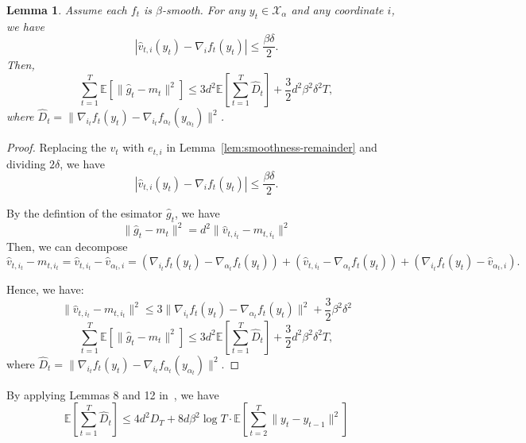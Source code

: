 \documentclass[journal,onecolumn]{IEEEtran}
\newcommand{\cX}{\mathcal{X}}
\theoremstyle{plain}
\newtheorem{lemma}[theorem]{Lemma}
\theoremstyle{definition}
\theoremstyle{remark}
\begin{document}
{\begin{lemma}
    Assume each $f_t$ is $\beta$-smooth. For any $y_t\in\cX_{\alpha}$ and any coordinate $i$, we have
    \begin{equation*}
        |\widehat{v}_{t,i}(y_t)-\nabla_i f_t(y_t)|\leq \frac{\beta\delta}{2}.
    \end{equation*}
    Then, 
    \begin{equation*}
        \sum_{t=1}^T \mathbb{E}\left[\|\widehat{g}_t-m_t\|^2\right]\leq 3d^2\mathbb{E}\left[\sum_{t=1}^T\widehat{D}_t\right]+\frac{3}{2}d^2\beta^2\delta^2T,
    \end{equation*}
    where $\widehat{D}_t=\|\nabla_{i_t} f_t(y_t)-\nabla_{i_t}f_{\alpha_t}(y_{\alpha_t})\|^2$.
\end{lemma}
\begin{proof}
    Replacing the $v_t$ with $e_{t,i}$ in Lemma~\ref{lem:smoothness-remainder} and dividing $2\delta$, we have
    \begin{equation*}
        |\widehat{v}_{t,i}(y_t)-\nabla_i f_t(y_t)|\leq \frac{\beta\delta}{2}.
    \end{equation*}

    By the defintion of the esimator $\widehat{g}_t$, we have
\begin{equation*}
    \|\widehat{g}_t-m_t\|^2=d^2\|\widehat{v}_{t,i_t}-m_{t,i_t}\|^2
\end{equation*}
Then, we can decompose 
\begin{equation*}
    \widehat{v}_{t,i_t}-m_{t,i_t}=\widehat{v}_{t,i_t}-\widehat{v}_{\alpha_t,i}=(\nabla_{i_t} f_t(y_t)-\nabla_{\alpha_t} f_t(y_t))+(\widehat{v}_{t,i_t}-\nabla_{\alpha_t} f_t(y_t))+(\nabla_{i_t} f_t(y_t)-\widehat{v}_{\alpha_t,i}).
\end{equation*}

Hence, we have:
\begin{equation*}
    \|\widehat{v}_{t,i_t}-m_{t,i_t}\|^2\leq 3\|\nabla_{i_t} f_t(y_t)-\nabla_{\alpha_t} f_t(y_t)\|^2+\frac{3}{2}\beta^2\delta^2
\end{equation*}
\begin{equation*}
    \sum_{t=1}^T \mathbb{E}\left[\|\widehat{g}_t-m_t\|^2\right]\leq 3d^2\mathbb{E}\left[\sum_{t=1}^T\widehat{D}_t\right]+\frac{3}{2}d^2\beta^2\delta^2T,
\end{equation*}
where $\widehat{D}_t=\|\nabla_{i_t} f_t(y_t)-\nabla_{i_t}f_{\alpha_t}(y_{\alpha_t})\|^2$.
\end{proof}

By applying Lemmas 8 and 12 in~\cite{chiang2013beating}, we have
\begin{equation}\label{eq:hatD}
\mathbb{E}\left[\sum_{t=1}^T\widehat{D}_t\right]\leq 4d^2 D_T+8d\beta^2\log T\cdot\mathbb{E}\left[\sum_{t=2}^T\|y_t-y_{t-1}\|^2\right]
\end{equation}

}
\end{document}
